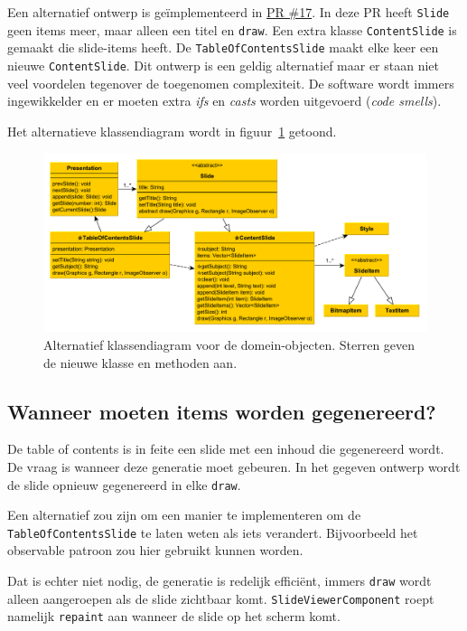 \documentclass[a4paper]{article}
\newcommand{\question}[1]{
  \subsection{#1}
}
\newcommand{\code}[1]{\lstinline[columns=fixed]{#1}}
\begin{document}
    Een alternatief ontwerp is geïmplementeerd in \hyperlink{https://github.com/DanielSchiavini/design-patterns-assignment/pull/17}{PR \#17}.
    In deze PR heeft \code{Slide} geen items meer, maar alleen een titel en \code{draw}.
    Een extra klasse \code{Content}\-\code{Slide} is gemaakt die slide-items heeft.
    De \code{TableOfContentsSlide} maakt elke keer een nieuwe \code{ContentSlide}.
    Dit ontwerp is een geldig alternatief maar er staan niet veel voordelen tegenover de toegenomen complexiteit.
    De software wordt immers ingewikkelder en er moeten extra \textit{ifs} en \textit{casts} worden uitgevoerd (\textit{code smells}).

    Het alternatieve klassendiagram wordt in figuur~\ref{fig:design-alternative} getoond.
    \begin{figure}[!htb]
     \caption{
        Alternatief klassendiagram voor de domein-objecten.\label{fig:design-alternative}
        Sterren geven de nieuwe klasse en methoden aan.
     }
     \centering \includegraphics[width=\textwidth]{Diagrams/design-alternative.pdf}
    \end{figure}


    \question{Wanneer moeten items worden gegenereerd?}
    De table of contents is in feite een slide met een inhoud die gegenereerd wordt.
    De vraag is wanneer deze generatie moet gebeuren.
    In het gegeven ontwerp wordt de slide opnieuw gegenereerd in elke \code{draw}.
    
    Een alternatief zou zijn om een manier te implementeren om de \code{TableOf}\-\code{ContentsSlide} te laten weten als iets verandert.
    Bijvoorbeeld het observable patroon zou hier gebruikt kunnen worden.
    
    Dat is echter niet nodig, de generatie is redelijk efficiënt, immers \code{draw} wordt alleen aangeroepen als de slide zichtbaar komt.
    \code{SlideViewerComponent} roept namelijk \code{repaint} aan wanneer de slide op het scherm komt.
    
\end{document}

